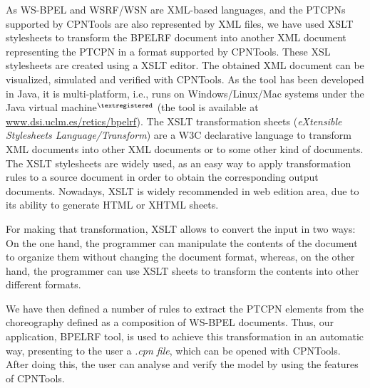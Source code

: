 As WS-BPEL and WSRF/WSN are XML-based languages, and the PTCPNs supported by CPNTools are also represented by XML files, we have used XSLT stylesheets to transform the BPELRF document into another XML document representing the PTCPN in a format supported by CPNTools. These XSL stylesheets are created using a XSLT editor. The obtained XML document can be visualized, simulated and verified with CPNTools. As the tool has been developed in Java, it is multi-platform, i.e., runs on Windows/Linux/Mac systems under the Java virtual machine$^{\textregistered}$ (the tool is available at \url{www.dsi.uclm.es/retics/bpelrf}).
The XSLT transformation sheets (\textsl{eXtensible Stylesheets Language/Transform}) are a W3C declarative language to transform XML documents into other XML documents or to some other kind of documents. The XSLT stylesheets are widely used, as an easy way to apply transformation rules to a source document in order to obtain the corresponding output documents. Nowadays, XSLT is widely recommended in web edition area, due to its ability to generate HTML or XHTML sheets.

For making that transformation, XSLT allows to convert the input in two ways: On the one hand, the programmer can manipulate the contents of the document to organize them without changing the document format, whereas, on the other hand, the programmer can use XSLT sheets to transform the contents into other  different formats.


We have then defined a number of rules to extract the PTCPN elements from the choreography defined as a composition of WS-BPEL documents. Thus, our application, BPELRF tool, is used to achieve this transformation in an automatic way, presenting to the user a \textit{.cpn file}, which can be opened with CPNTools. After doing this, the user can analyse and verify the model by using the features of CPNTools. 
        

